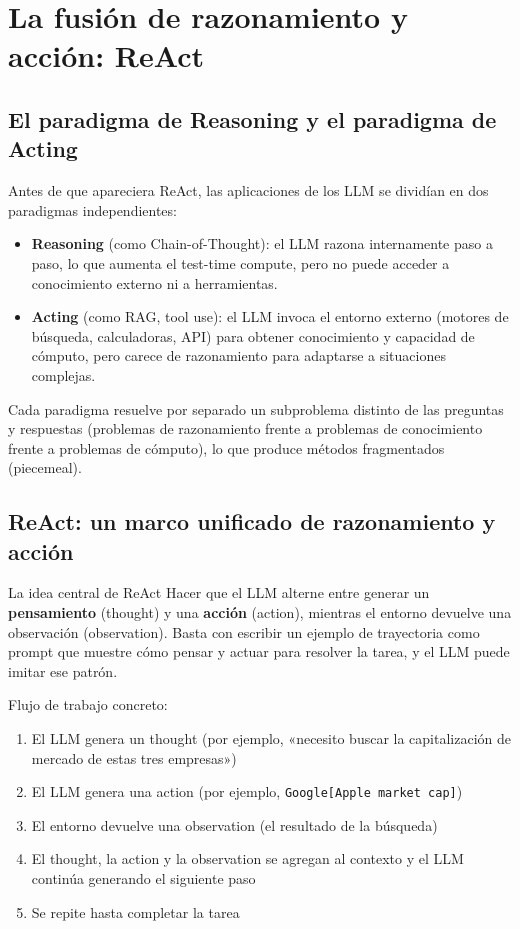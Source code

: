 \section{La fusión de razonamiento y acción: ReAct}

\subsection{El paradigma de Reasoning y el paradigma de Acting}

Antes de que apareciera ReAct, las aplicaciones de los LLM se dividían en dos paradigmas independientes:

\begin{itemize}
    \item \textbf{Reasoning} (como Chain-of-Thought): el LLM razona internamente paso a paso, lo que aumenta el test-time compute, pero no puede acceder a conocimiento externo ni a herramientas.
    \item \textbf{Acting} (como RAG, tool use): el LLM invoca el entorno externo (motores de búsqueda, calculadoras, API) para obtener conocimiento y capacidad de cómputo, pero carece de razonamiento para adaptarse a situaciones complejas.
\end{itemize}

Cada paradigma resuelve por separado un subproblema distinto de las preguntas y respuestas (problemas de razonamiento frente a problemas de conocimiento frente a problemas de cómputo), lo que produce métodos fragmentados (piecemeal).

\subsection{ReAct: un marco unificado de razonamiento y acción}

\begin{importantbox}{La idea central de ReAct}
Hacer que el LLM alterne entre generar un \textbf{pensamiento} (thought) y una \textbf{acción} (action), mientras el entorno devuelve una observación (observation). Basta con escribir un ejemplo de trayectoria como prompt que muestre cómo pensar y actuar para resolver la tarea, y el LLM puede imitar ese patrón.
\end{importantbox}

Flujo de trabajo concreto:
\begin{enumerate}
    \item El LLM genera un thought (por ejemplo, «necesito buscar la capitalización de mercado de estas tres empresas»)
    \item El LLM genera una action (por ejemplo, \texttt{Google{[}Apple market cap{]}})
    \item El entorno devuelve una observation (el resultado de la búsqueda)
    \item El thought, la action y la observation se agregan al contexto y el LLM continúa generando el siguiente paso
    \item Se repite hasta completar la tarea
\end{enumerate}

